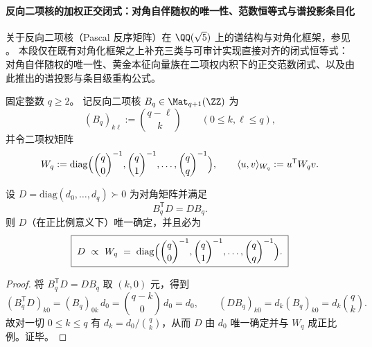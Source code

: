 \paragraph{反向二项核的加权正交闭式：对角自伴随权的唯一性、范数恒等式与谱投影条目化}
\begin{remark}[文献定位与陈述范围]\label{rem:xi-binomial-matrix-literature-scope}
关于反向二项核（Pascal 反序矩阵）在 \(\QQ(\sqrt5)\) 上的谱结构与对角化框架，参见 \cite{StanicaPeeleBinomialMatrix2000,LiverancePitsenberger1996DiagonalizationBinomialMatrix}。
本段仅在既有对角化框架之上补充三类与可审计实现直接对齐的闭式恒等式：对角自伴随权的唯一性、黄金本征向量族在二项权内积下的正交范数闭式、以及由此推出的谱投影与条目级重构公式。
\end{remark}
\par
固定整数 \(q\ge 2\)。
记反向二项核 \(B_q\in \Mat_{q+1}(\ZZ)\) 为
\[
(B_q)_{k\ell}:=\binom{q-\ell}{k}\qquad(0\le k,\ell\le q),
\]
并令二项权矩阵
\[
W_q:=\mathrm{diag}\Bigl(\binom{q}{0}^{-1},\binom{q}{1}^{-1},\dots,\binom{q}{q}^{-1}\Bigr),
\qquad
\langle u,v\rangle_{W_q}:=u^{\mathsf T}W_qv.
\]

\begin{conclusion}\label{con:xi-bq-unique-diagonal-selfadjoint}
设 \(D=\mathrm{diag}(d_0,\dots,d_q)\succ 0\) 为对角矩阵并满足
\[
B_q^{\mathsf T}D=DB_q.
\]
则 \(D\)（在正比例意义下）唯一确定，并且必为
\[
\boxed{\;
D\ \propto\ W_q
\;=\;
\mathrm{diag}\Bigl(\binom{q}{0}^{-1},\binom{q}{1}^{-1},\dots,\binom{q}{q}^{-1}\Bigr).\;}
\]
\end{conclusion}
\begin{proof}
将 \(B_q^{\mathsf T}D=DB_q\) 取 \((k,0)\) 元，得到
\[
(B_q^{\mathsf T}D)_{k0}=(B_q)_{0k}\,d_0=\binom{q-k}{0}\,d_0=d_0,
\qquad
(DB_q)_{k0}=d_k(B_q)_{k0}=d_k\binom{q}{k}.
\]
故对一切 \(0\le k\le q\) 有 \(d_k=d_0/\binom{q}{k}\)，从而 \(D\) 由 \(d_0\) 唯一确定并与 \(W_q\) 成正比例。证毕。
\end{proof}

